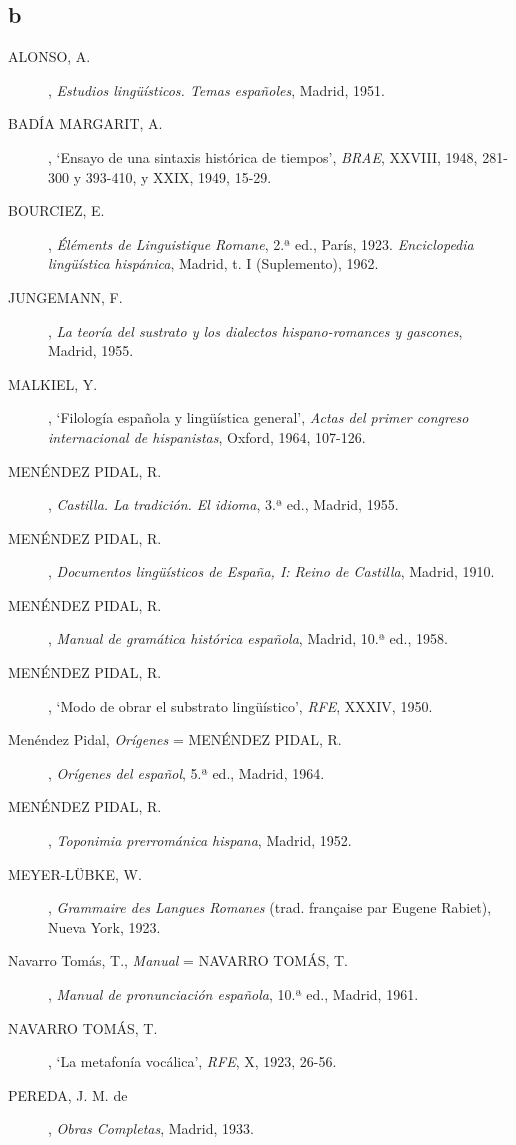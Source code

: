 \subsection{b} \begin{description}
\item[ALONSO, A.], \textit{Estudios lingüísticos. Temas españoles}, Madrid, 1951.
\item[BADÍA MARGARIT, A.], `Ensayo de una sintaxis histórica de tiempos', \textit{BRAE}, XXVIII, 1948, 281-300 y 393-410, y XXIX, 1949, 15-29.
\item[BOURCIEZ, E.], \textit{Éléments de Linguistique Romane}, 2.ª ed., París, 1923. \textit{Enciclopedia lingüística hispánica}, Madrid, t. I (Suplemento), 1962.
\item[JUNGEMANN, F.], \textit{La teoría del sustrato y los dialectos hispano-romances y gascones}, Madrid, 1955.
\item[MALKIEL, Y.], `Filología española y lingüística general', \textit{Actas del primer congreso internacional de hispanistas}, Oxford, 1964, 107-126.
\item[MENÉNDEZ PIDAL, R.], \textit{Castilla. La tradición. El idioma}, 3.ª ed., Madrid, 1955.
\item[MENÉNDEZ PIDAL, R.], \textit{Documentos lingüísticos de España, I: Reino de Castilla}, Madrid, 1910.
\item[MENÉNDEZ PIDAL, R.], \textit{Manual de gramática histórica española}, Madrid, 10.ª ed., 1958.
\item[MENÉNDEZ PIDAL, R.], `Modo de obrar el substrato lingüístico', \textit{RFE},  XXXIV, 1950.
\item[Menéndez Pidal, \textit{Orígenes} = MENÉNDEZ PIDAL, R.], \textit{Orígenes del español},  5.ª ed., Madrid, 1964.
\item[MENÉNDEZ PIDAL, R.], \textit{Toponimia prerrománica hispana}, Madrid, 1952.
\item[MEYER-LÜBKE, W.], \textit{Grammaire des Langues Romanes} (trad. française par Eugene Rabiet), Nueva York, 1923.
\item[Navarro Tomás, T., \textit{Manual} = NAVARRO TOMÁS, T.], \textit{Manual de pronunciación española}, 10.ª ed., Madrid, 1961.
\item[NAVARRO TOMÁS, T.], `La metafonía vocálica', \textit{RFE}, X, 1923, 26-56.
\item[PEREDA, J. M. de], \textit{Obras Completas}, Madrid, 1933.
\end{description}

\tableofcontents

